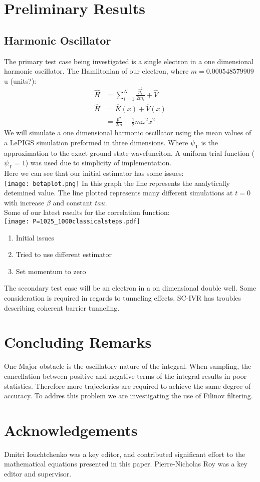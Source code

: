 \documentclass[12pt,letterpaper,oneside,final,titlepage]{article}               %
\numberwithin{equation}{section} %
\newcommand{\psiT}{\psi_{\textrm{T}}}
\begin{document}
\section{Preliminary Results}

\subsection*{Harmonic Oscillator}
The primary test case being investigated is a single electron in a one dimensional harmonic oscillator. 
The Hamiltonian of our electron, where $m = \num{0.000548579909}$u (units?): 
\begin{align}
    \hat{H} &= \sum_{i=1}^{N}\frac{\hat{p}_{i}^2}{2m_{i}} + \hat{V} \\
    \hat{H} &= \hat{K}(x) + \hat{V}(x) \\
            &= \frac{p^2}{2m} + \frac{1}{2} m \omega^{2} x^{2} 
\end{align}
We will simulate a one dimensional harmonic oscillator using the mean values of a LePIGS simulation preformed in three dimensions. 
Where $\psiT$ is the approximation to the exact ground state wavefunciton. 
A uniform trial function ($\psiT = 1$) was used due to simplicity of implementation. \\
Here we can see that our initial estimator has some issues:\\
\texttt{[image: betaplot.png]}
In this graph the line represents the analytically detemined value.
The line plotted represents many different simulations at $t=0$ with increase $\beta$ and constant $tau$.\\
Some of our latest results for the correlation function:\\
\texttt{[image: P=1025\_1000classicalsteps.pdf]}
\begin{enumerate}
    \item Initial issues
    \item Tried to use different estimator
    \item Set momentum to zero
\end{enumerate}

The secondary test case will be an electron in a on dimensional double well. 
Some consideration is required in regards to tunneling effects. SC-IVR has troubles describing coherent barrier tunneling.

\section{Concluding Remarks}
One Major obstacle is the oscillatory nature of the integral. When sampling, the cancellation between positive and negative terms of the integral results in poor statistics. Therefore more trajectories are required to achieve the same degree of accuracy. To addres this problem we are investigating the use of Filinov filtering.


\section{Acknowledgements}
Dmitri Iouchtchenko was a key editor, and contributed significant effort to the mathematical equations presented in this paper. 
Pierre-Nicholas Roy was a key editor and supervisor.

\renewcommand*{\bibfont}{\scriptsize}
\printbibliography
\end{document}
